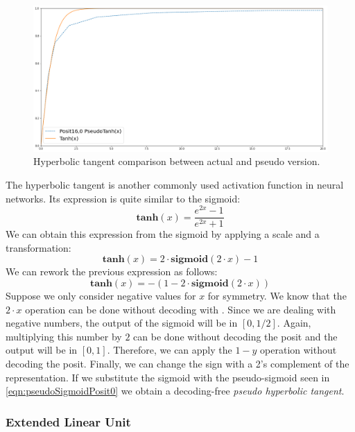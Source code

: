 \begin{figure}
    \centering
    \includegraphics[width=\linewidth]{img/tanhPosit160.png}
    \caption{Hyperbolic tangent comparison between actual and pseudo version.}
    \label{fig:pseudoTanhPosit0}
\end{figure}
The hyperbolic tangent is another commonly used activation function in neural networks. Its expression is quite similar to the sigmoid:
\begin{equation}
    \mathbf{tanh}(x) = \frac{e^{2x}-1}{e^{2x}+1} 
\end{equation}
We can obtain this expression from the sigmoid by applying a scale and a transformation:
\begin{equation}
   \mathbf{tanh}(x) =  2 \cdot \mathbf{sigmoid}(2 \cdot x) - 1
\end{equation}
We can rework the previous expression as follows:
\begin{equation}
    \mathbf{tanh}(x) = - ( 1 - 2\cdot \mathbf{sigmoid}(2\cdot x))
\end{equation}
Suppose we only consider negative values for $x$ for symmetry. We know that the $2\cdot x$ operation can be done without decoding with . Since we are dealing with negative numbers, the output of the sigmoid will be in $[0,1/2]$. Again, multiplying this number by $2$ can be done without decoding the posit and the output will be in $[0,1]$. Therefore, we can apply the $1-y$ operation without decoding the posit. Finally, we can change the sign with a 2's complement of the representation.
If we substitute the sigmoid with the pseudo-sigmoid seen in \eqref{eqn:pseudoSigmoidPosit0} we obtain a decoding-free \textit{pseudo hyperbolic tangent}.

\subsubsection{Extended Linear Unit}

